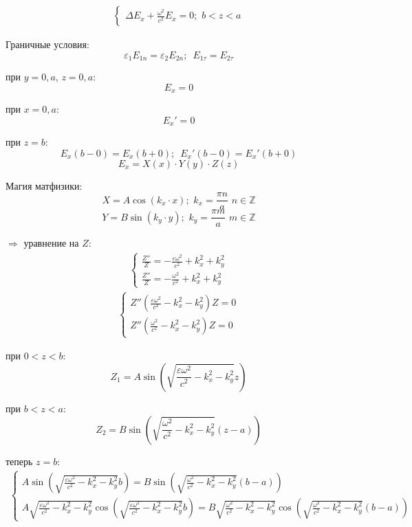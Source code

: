 \documentclass[12pt]{article}
\begin{document}
\begin{large}
\begin{eqnarray*}
\begin{cases}
        \Delta E_x + \frac{\omega^2}{c^2} E_x = 0 ; \,\, b < z < a
    \end{cases}
\end{eqnarray*}
\par Граничные условия:
\[
    \varepsilon_1 E_{1n} = \varepsilon_2 E_{2n} ; \,\,\, E_{1\tau} = E_{2\tau}
\]
\par при $y = 0, a$, $z = 0, a$:
\[
    E_x = 0
\]
\par при $x = 0, a$:
\[
    E_x' = 0
\]
\par при $z = b$:
\[
    E_x(b-0) = E_x(b+0) ; \,\,\, E_x'(b-0) = E_x'(b+0)
\]
\[
    E_x = X(x) \cdot Y(y) \cdot Z(z)
\]
\par Магия матфизики:
\[
    X = A \cos(k_x \cdot x) ; \,\, k_x = \frac{\pi n}{a} \,\, n \in \mathbb{Z}
\]
\[
    Y = B \sin(k_y \cdot y) ; \,\, k_y = \frac{\pi m}{a} \,\, m \in \mathbb{Z}
\]
\par $\Rightarrow$ уравнение на $Z$:
\begin{eqnarray*}
    \begin{cases}
        \frac{Z''}{Z} = -\frac{\varepsilon \omega^2}{c^2} + k_x^2 + k_y^2 \\
        \frac{Z''}{Z} = -\frac{\omega^2}{c^2} + k_x^2 + k_y^2
    \end{cases}
\end{eqnarray*}
\begin{eqnarray*}
    \begin{cases}
        Z'' \left( \frac{\varepsilon \omega^2}{c^2} - k_x^2 - k_y^2 \right) Z = 0 \\
        Z'' \left( \frac{\omega^2}{c^2} - k_x^2 - k_y^2 \right) Z = 0
    \end{cases}
\end{eqnarray*}
\par при $0 < z < b$:
\[
    Z_1 = A \sin\left(\sqrt{\frac{\varepsilon \omega^2}{c^2} - k_x^2 - k_y^2} z\right)
\]
\par при $b < z < a$:
\[
    Z_{2} = B \sin\left(\sqrt{\frac{ \omega^2}{c^2} - k_x^2 - k_y^2} \left(z-a\right)\right)
\]
\par теперь $z = b$:
\begin{eqnarray*}
    \begin{cases}
        A \sin\left(\sqrt{\frac{\varepsilon \omega^2}{c^2} - k_x^2 - k_y^2} b\right) = B \sin\left(\sqrt{\frac{ \omega^2}{c^2} - k_x^2 - k_y^2} \left(b-a\right)\right) \\
        A \sqrt{\frac{\varepsilon \omega^2}{c^2} - k_x^2 - k_y^2} \cos\left(\sqrt{\frac{\varepsilon \omega^2}{c^2} - k_x^2 - k_y^2} b\right) = B \sqrt{\frac{\omega^2}{c^2} - k_x^2 - k_y^2} \cos\left(\sqrt{\frac{\omega^2}{c^2} - k_x^2 - k_y^2} \left(b-a\right)\right)

\end{cases}
\end{eqnarray*}
\end{large}
\end{document}
